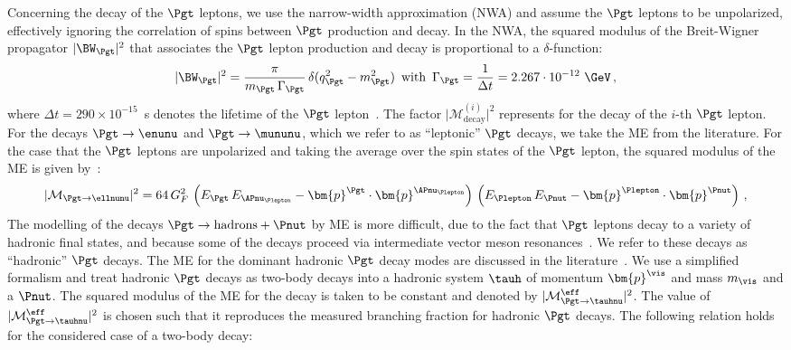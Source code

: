 Concerning the decay of the $\Pgt$ leptons,
we use the narrow-width approximation (NWA) and assume the $\Pgt$ leptons to be unpolarized,
effectively ignoring the correlation of spins between $\Pgt$
production and decay.
In the NWA, the squared modulus of the Breit-Wigner propagator $\vert
\BW_{\Pgt} \vert^{2}$ that associates the $\Pgt$ lepton production and
decay is proportional to a $\delta$-function:
\begin{equation}
\vert \BW_{\Pgt} \vert^{2} = \frac{\pi}{m_{\Pgt} \, \Gamma_{\Pgt}} \,
\delta ( q_{\Pgt}^{2} - m_{\Pgt}^{2} ) \, \mbox{ with } \, 
\Gamma_{\Pgt} = \frac{1}{\Delta t} =
 2.267 \cdot 10^{-12}\textrm{~\GeV} \, ,
\end{equation}
where $\Delta t = 290 \times 10^{-15}$~s denotes the lifetime of the
$\Pgt$ lepton~\cite{PDG}.
The factor $\vert \mathcal{M}^{(i)}_{\textrm{decay}}
\vert^{2}$ represents for the decay of the $i$-th $\Pgt$ lepton.
For the decays $\Pgt \to \enunu$ and $\Pgt
\to \mununu$, which we refer to as ``leptonic'' $\Pgt$ decays, we take the ME from the literature.
For the case that the $\Pgt$ leptons are unpolarized and taking the average over the spin states of the $\Pgt$ lepton,
the squared modulus of the ME is given by~\cite{Barger:1987nn}:
\begin{equation}
\vert\mathcal{M}_{\Pgt \to \ellnunu} \vert^{2} = 64 \, G^{2}_{F} \,
\left( E_{\Pgt} \, E_{\APnu_{\Plepton}} - \bm{p}^{\Pgt} \cdot
  \bm{p}^{\APnu_{\Plepton}} \right) \, \left( E_{\Plepton} \,
  E_{\Pnut} - \bm{p}^{\Plepton} \cdot \bm{p}^{\Pnut} \right) \, , 
\label{eq:leptonic_tau_decays_ME}
\end{equation}
The modelling of the decays $\Pgt \to \textrm{hadrons} + \Pnut$ 
by ME is more difficult, 
due to the fact that $\Pgt$ leptons decay to a variety of hadronic
final states, and because some of the decays proceed via intermediate vector
meson resonances~\cite{PDG}.
We refer to these decays as ``hadronic'' $\Pgt$ decays.
The ME for the dominant hadronic $\Pgt$ decay modes are discussed in the literature~\cite{Bullock:1992yt,Raychaudhuri:1995kv}.
We use a simplified formalism and treat hadronic $\Pgt$ decays as two-body decays into a hadronic system $\tauh$ of momentum $\bm{p}^{\vis}$ and mass $m_{\vis}$ and a $\Pnut$.
The squared modulus of the ME for the decay is taken to be constant and denoted by $\vert\mathcal{M}^{\eff}_{\Pgt \to \tauhnu}\vert^{2}$.
The value of $\vert\mathcal{M}^{\eff}_{\Pgt \to \tauhnu}\vert^{2}$ is
chosen such that it reproduces the measured branching fraction for hadronic $\Pgt$ decays.
The following relation holds for the considered case of a two-body decay:
